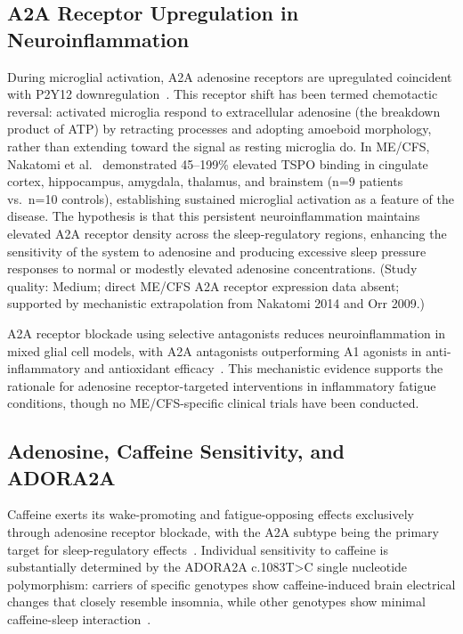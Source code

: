 \subsection{A2A Receptor Upregulation in Neuroinflammation}

\begin{hypothesis}
\label{hyp:ch15-a2a-neuroinflammation}
During microglial activation, A2A adenosine receptors are upregulated coincident with P2Y12 downregulation~\cite{Orr2009A2AMicroglia}. This receptor shift has been termed chemotactic reversal: activated microglia respond to extracellular adenosine (the breakdown product of ATP) by retracting processes and adopting amoeboid morphology, rather than extending toward the signal as resting microglia do. In ME/CFS, Nakatomi et al.~\cite{Nakatomi2014Neuroinflammation} demonstrated 45--199\% elevated TSPO binding in cingulate cortex, hippocampus, amygdala, thalamus, and brainstem (n=9 patients vs.~n=10 controls), establishing sustained microglial activation as a feature of the disease. The hypothesis is that this persistent neuroinflammation maintains elevated A2A receptor density across the sleep-regulatory regions, enhancing the sensitivity of the system to adenosine and producing excessive sleep pressure responses to normal or modestly elevated adenosine concentrations.
(Study quality: Medium; direct ME/CFS A2A receptor expression data absent; supported by mechanistic extrapolation from Nakatomi 2014 and Orr 2009.)
\end{hypothesis}

A2A receptor blockade using selective antagonists reduces neuroinflammation in mixed glial cell models, with A2A antagonists outperforming A1 agonists in anti-inflammatory and antioxidant efficacy~\cite{Navia2020AdenosineReceptors}. This mechanistic evidence supports the rationale for adenosine receptor-targeted interventions in inflammatory fatigue conditions, though no ME/CFS-specific clinical trials have been conducted.

\subsection{Adenosine, Caffeine Sensitivity, and ADORA2A}

Caffeine exerts its wake-promoting and fatigue-opposing effects exclusively through adenosine receptor blockade, with the A2A subtype being the primary target for sleep-regulatory effects~\cite{Huang2024Adenosine}. Individual sensitivity to caffeine is substantially determined by the ADORA2A c.1083T>C single nucleotide polymorphism: carriers of specific genotypes show caffeine-induced brain electrical changes that closely resemble insomnia, while other genotypes show minimal caffeine-sleep interaction~\cite{Retey2007ADORA2A}.

